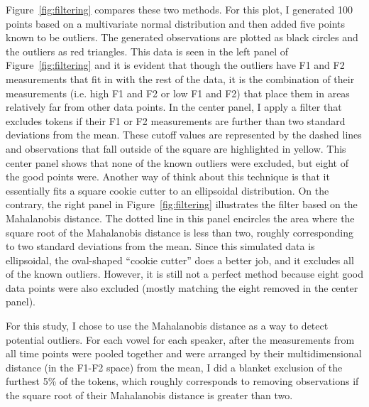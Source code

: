 Figure~\ref{fig:filtering} compares these two methods. For this plot, I generated 100 points based on a multivariate normal distribution and then added five points known to be outliers. The generated observations are plotted as black circles and the outliers as red triangles. This data is seen in the left panel of Figure~\ref{fig:filtering} and it is evident that though the outliers have F1 and F2 measurements that fit in with the rest of the data, it is the combination of their measurements (i.e. high F1 and F2 or low F1 and F2) that place them in areas relatively far from other data points. In the center panel, I apply a filter that excludes tokens if their F1 or F2 measurements are further than two standard deviations from the mean. These cutoff values are represented by the dashed lines and observations that fall outside of the square are highlighted in yellow. This center panel shows that none of the known outliers were excluded, but eight of the good points were. Another way of think about this technique is that it essentially fits a square cookie cutter to an ellipsoidal distribution. On the contrary, the right panel in Figure~\ref{fig:filtering} illustrates the filter based on the Mahalanobis distance. The dotted line in this panel encircles the area where the square root of the Mahalanobis distance is less than two, roughly corresponding to two standard deviations from the mean. Since this simulated data is ellipsoidal, the oval-shaped “cookie cutter” does a better job, and it excludes all of the known outliers. However, it is still not a perfect method because eight good data points were also excluded (mostly matching the eight removed in the center panel).

For this study, I chose to use the Mahalanobis distance as a way to detect potential outliers. For each vowel for each speaker, after the measurements from all time points were pooled together and were arranged by their multidimensional distance (in the F1-F2 space) from the mean, I did a blanket exclusion of the furthest 5\% of the tokens, which roughly corresponds to removing observations if the square root of their Mahalanobis distance is greater than two.

